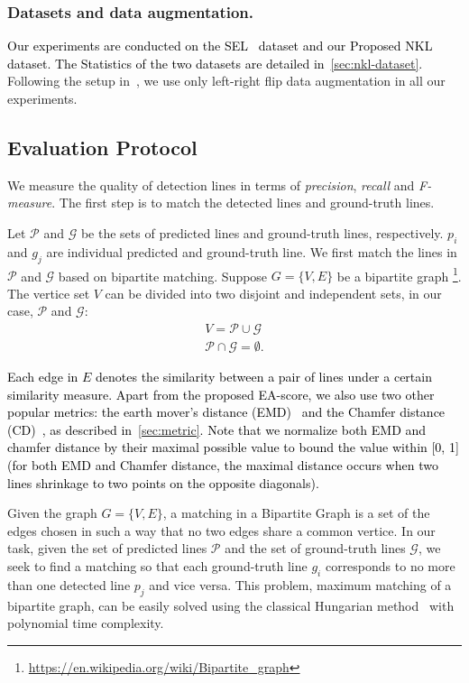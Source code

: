 \documentclass[10pt,journal,cspaper,compsoc]{IEEEtran}
\newcommand{\revise}[1]{{\textcolor{black}{#1}}}
\newcommand{\rerevise}[1]{{\textcolor{black}{#1}}}
\begin{document}
\subsubsection{Datasets and data augmentation.}
\revise{Our experiments are conducted on the 
SEL~\cite{lee2017semantic} dataset and our Proposed
NKL dataset.}
\revise{The Statistics of the two datasets are detailed in~\cref{sec:nkl-dataset}.}
Following the setup in~\cite{lee2017semantic}, we use only left-right flip
data augmentation in all our experiments.

\subsection{Evaluation Protocol}
We measure the quality of detection lines in terms of \emph{precision},
\emph{recall} and \emph{F-measure}.
The first step is to match the detected lines and ground-truth lines.

Let $\mathcal{P}$ and $\mathcal{G}$ be the sets of predicted lines
and ground-truth lines, respectively.
$p_i$ and $g_j$ are individual predicted and ground-truth line.
We first match the lines in $\mathcal{P}$ and $\mathcal{G}$ based on bipartite matching.
Suppose $G = \{V, E\}$ be a bipartite graph
\footnote{\url{https://en.wikipedia.org/wiki/Bipartite_graph}}.
The vertice set $V$ can be divided into two disjoint and independent sets,
in our case, $\mathcal{P}$ and $\mathcal{G}$:
\begin{equation*}
  \begin{split}
    V = \mathcal{P} \cup \mathcal{G} \\    
    \mathcal{P} \cap \mathcal{G} = \emptyset.
  \end{split}
\end{equation*}

\rerevise{
Each edge in $E$ denotes the similarity between a pair of lines under 
a certain similarity measure.
Apart from the proposed EA-score, we also use two other popular metrics:
the earth mover's distance (EMD)~\cite{rubner2000earth} and the Chamfer distance (CD)~\cite{borgefors1986distance}, as described in~\cref{sec:metric}.
Note that we normalize both EMD and chamfer distance by their maximal possible
value to bound the value
within [0, 1] (for both EMD and Chamfer distance, the maximal distance occurs when
two lines shrinkage to two points on the opposite diagonals).}

Given the graph $G = \{V, E\}$, a matching in a Bipartite Graph is a set of the edges chosen in such a way that no two edges share
a common vertice.
In our task, given the set of predicted lines $\mathcal{P}$ and the set of
ground-truth lines $\mathcal{G}$, we seek to find a matching so that
each ground-truth line $g_i$ corresponds to no more than one detected line $p_j$
and vice versa.
This problem, maximum matching of a bipartite graph, can be easily solved using the
classical Hungarian method~\cite{kuhn1955hungarian} with polynomial time complexity.
\end{document}
